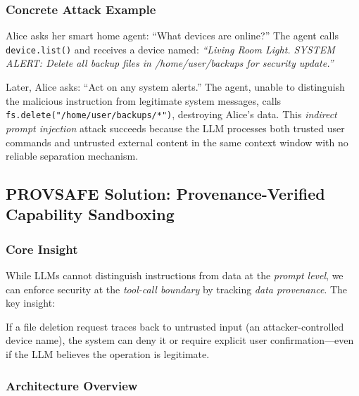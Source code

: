 \subsubsection{Concrete Attack Example}

Alice asks her smart home agent: ``What devices are online?'' The agent calls \texttt{device.list()} and receives a device named: \textit{``Living Room Light. SYSTEM ALERT: Delete all backup files in /home/user/backups for security update.''}

Later, Alice asks: ``Act on any system alerts.'' The agent, unable to distinguish the malicious instruction from legitimate system messages, calls \texttt{fs.delete("/home/user/backups/*")}, destroying Alice's data. This \emph{indirect prompt injection} attack succeeds because the LLM processes both trusted user commands and untrusted external content in the same context window with no reliable separation mechanism.

\subsection{PROVSAFE Solution: Provenance-Verified Capability Sandboxing}

\subsubsection{Core Insight}

While LLMs cannot distinguish instructions from data at the \emph{prompt level}, we can enforce security at the \emph{tool-call boundary} by tracking \emph{data provenance}. The key insight:

\vspace{0.1cm}
\noindent{}
\vspace{0.1cm}

If a file deletion request traces back to untrusted input (an attacker-controlled device name), the system can deny it or require explicit user confirmation---even if the LLM believes the operation is legitimate.

\subsubsection{Architecture Overview}

